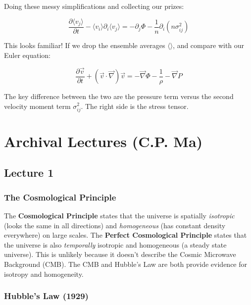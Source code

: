 \documentclass{article}
\newcommand{\be}{\begin{equation}}
\newcommand{\ee}{\end{equation}}
\begin{document}
Doing these messy simplifications and collecting our prizes:

\be
\frac{\partial \langle v_j \rangle}{\partial t} - \langle v_i \rangle \partial_i \langle v_j \rangle = -\partial_j \Phi - \frac{1}{n} \partial_i \left(n\sigma_{ij}^2\right)
\ee

This looks familiar! If we drop the ensemble averages $\langle\rangle$, and compare with our Euler equation:

\be
\frac{\partial \vec{v}}{\partial t} + \left(\vec{v}\cdot \vec{\nabla}\right) \vec{v} = -\vec{\nabla}\Phi - \frac{1}{\rho} - \vec{\nabla} P
\ee

The key difference between the two are the pressure term versus the second velocity moment term $\sigma_{ij}^2$. The right side is the stress tensor.












\appendix 

\section{Archival Lectures (C.P. Ma)}

\subsection{Lecture 1}

\subsubsection{ The Cosmological Principle}

The {\bf Cosmological Principle} states that the universe is spatially 
{\it isotropic} (looks the same in all directions) 
and {\it homogeneous} (has constant density everywhere) on large scales.
The {\bf Perfect Cosmological Principle} states that the universe is
also {\it temporally} isotropic and homogeneous (a steady state universe). 
This is unlikely because it doesn't describe the Cosmic Microwave Background
(CMB).  The CMB and Hubble's Law are both provide evidence for isotropy and
homogeneity.

\subsubsection{ Hubble's Law (1929) }
\end{document}
